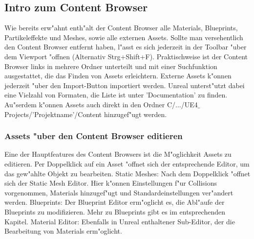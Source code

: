 \documentclass[11pt, titlepage]{article}
\begin{document}
\subsection{Intro zum Content Browser}

\noindent Wie bereits erw"ahnt enth"alt der Content Browser alle Materials, Blueprints, Partikeleffekte und Meshes, sowie alle externen Assets. Sollte man versehentlich den Content Browser entfernt haben, l"asst es sich jederzeit in der Toolbar "uber dem Viewport "offnen (Alternativ Strg+Shift+F). Praktischweise ist der Content Browser links in mehrere Ordner unterteilt und mit einer Suchfunktion ausgestattet, die das Finden von Assets erleichtern. \newline
\newline
\noindent Externe Assets k"onnen jederzeit "uber den Import-Button importiert werden. Unreal unterst"utzt dabei eine Vielzahl von Formaten, die Liste ist unter 'Documentation' zu finden. Au"serdem k"onnen Assets auch direkt in den Ordner C/.../UE4$\_$Projects/'Projektname'/Content hinzugef"ugt werden. \newline

\subsubsection{Assets "uber den Content Browser editieren}

\noindent Eine der Hauptfeatures des Content Browsers ist die M"oglichkeit Assets zu editieren. Per Doppelklick auf ein Asset "offnet sich der entsprechende Editor, um das gew"ahlte Objekt zu bearbeiten. \newline
\newline
\noindent Static Meshes: \newline
\noindent Nach dem Doppelklick "offnet sich der Static Mesh Editor. Hier k"onnen Einstellungen f"ur Collisions vorgenommen, Materials hinzugef"ugt und Standardeinstellungen ver"andert werden. \newline
\newline
\noindent Blueprints: \newline
\noindent Der Blueprint Editor erm"oglicht es, die Abl"aufe der Blueprints zu modifizieren. Mehr zu Blueprints gibt es im entsprechenden Kapitel. \newline
\newline
\noindent Material Editor: \newline
\noindent Ebenfalls in Unreal enthaltener Sub-Editor, der die Bearbeitung von Materials erm"oglicht. 
\end{document}
